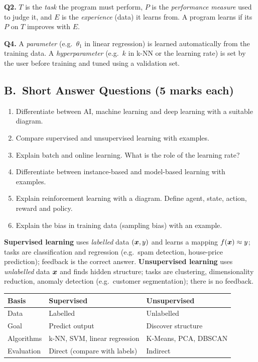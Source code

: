 \begin{modelans}[: Q2 and Q4]
\textbf{Q2.} $T$ is the \emph{task} the program must perform, $P$ is the \emph{performance measure} used to judge it, and $E$ is the \emph{experience} (data) it learns from. A program learns if its $P$ on $T$ improves with $E$.\par
\textbf{Q4.} A \emph{parameter} (e.g.\ $\theta_1$ in linear regression) is learned automatically from the training data. A \emph{hyperparameter} (e.g.\ $k$ in k-NN or the learning rate) is set by the user before training and tuned using a validation set.
\end{modelans}

\subsection*{B.\ Short Answer Questions (5 marks each)}
\begin{enumerate}
  \item Differentiate between AI, machine learning and deep learning with a suitable diagram. 
  \item Compare supervised and unsupervised learning with examples. 
  \item Explain batch and online learning. What is the role of the learning rate? 
  \item Differentiate between instance-based and model-based learning with examples. 
  \item Explain reinforcement learning with a diagram. Define agent, state, action, reward and policy. 
  \item Explain the bias in training data (sampling bias) with an example. 
\end{enumerate}

\begin{modelans}
\textbf{Supervised learning} uses \emph{labelled} data $(\boldsymbol{x},y)$ and learns a mapping $f(\boldsymbol{x})\approx y$; tasks are classification and regression (e.g.\ spam detection, house-price prediction); feedback is the correct answer. \textbf{Unsupervised learning} uses \emph{unlabelled} data $\boldsymbol{x}$ and finds hidden structure; tasks are clustering, dimensionality reduction, anomaly detection (e.g.\ customer segmentation); there is no feedback.\par
\begin{center}\small
\begin{tabular}{@{}lll@{}}
\toprule
\textbf{Basis} & \textbf{Supervised} & \textbf{Unsupervised}\\
\midrule
Data & Labelled & Unlabelled\\
Goal & Predict output & Discover structure\\
Algorithms & k-NN, SVM, linear regression & K-Means, PCA, DBSCAN\\
Evaluation & Direct (compare with labels) & Indirect\\
\bottomrule
\end{tabular}
\end{center}
\end{modelans}

